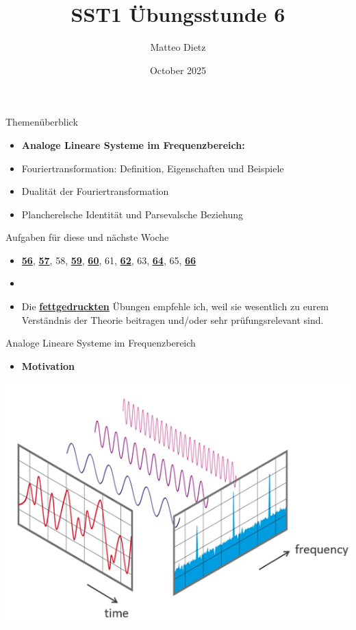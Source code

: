 \documentclass[14pt, aspectratio=169, handout]{beamer}
\title{SST1 Übungsstunde 6}
\author{Matteo Dietz}
\date{October 2025}
\begin{document}
\maketitle

\begin{frame}{Themenüberblick}
    \begin{itemize}
        \item \textbf{Analoge Lineare Systeme im Frequenzbereich:}
    \item[] Fouriertransformation: Definition, Eigenschaften und Beispiele
    \item[] Dualität der Fouriertransformation
    \item[] Plancherelsche Identität und Parsevalsche Beziehung
    \end{itemize}
\end{frame}

\begin{frame}{Aufgaben für diese und nächste Woche}
    \begin{itemize}
        \item[] \underline{\textbf{56}}, \underline{\textbf{57}}, 58, \underline{\textbf{59}}, \underline{\textbf{60}}, 61, \underline{\textbf{62}}, 63, \underline{\textbf{64}}, 65, \underline{\textbf{66}}
        \item[] 
        \item[] Die \underline{\textbf{fettgedruckten}} Übungen empfehle ich, weil sie wesentlich zu eurem Verständnis der Theorie beitragen und/oder sehr prüfungsrelevant sind.
    \end{itemize}
\end{frame}

\begin{frame}{Analoge Lineare Systeme im Frequenzbereich}
\begin{itemize}
    \item \textbf{Motivation}
\end{itemize}
\begin{center}
     \includegraphics[width=0.65\linewidth]{figures/Zeit_und_Frequenzbereich.png}
\end{center} 
\end{frame}
\end{document}
